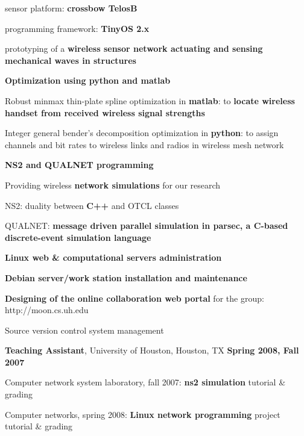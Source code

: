 \documentclass[overlapped, line]{resume}
\begin{document}
\begin{resume}
\begin{list2}
           \begin{list2}
           \item sensor platform: {\bf crossbow TelosB}
           \item programming framework: {\bf TinyOS 2.x}
           \item prototyping of a {\bf wireless sensor network actuating and sensing mechanical waves in structures}
           \end{list2}
         \item \textbf{Optimization using python and matlab}
           \begin{list2}
           \item Robust minmax thin-plate spline optimization in \textbf{matlab}: to {\bf locate wireless handset from received wireless signal strengths}
           \item Integer general bender's decomposition optimization in \textbf{python}: to assign channels and bit rates to wireless links and radios in wireless mesh network
           \end{list2}
         \item \textbf{NS2 and QUALNET programming}
           \begin{list2}
           \item Providing wireless \textbf{network simulations} for our research
           \item NS2: duality between {\bf C++} and OTCL classes
           \item QUALNET: {\bf message driven parallel simulation in parsec, a C-based discrete-event simulation language}
           \end{list2}
         \item \textbf{Linux web \& computational servers administration}
           \begin{list2}
           \item \textbf{Debian server/work station installation and maintenance}
           \item {\bf Designing of the online collaboration web portal} for the group: http://moon.cs.uh.edu
           \item Source version control system management
           \end{list2}
         \end{list2}  \vspace{-5pt}

         {\bf Teaching Assistant}, University of Houston, Houston, TX \hfill {\bf Spring 2008, Fall 2007}\\
         \vspace{-10pt}      %
         \begin{list2}
         \item Computer network system laboratory, fall 2007: \textbf{ns2 simulation} tutorial \& grading
         \item Computer networks, spring 2008: \textbf{Linux network programming} project tutorial \& grading
         \end{list2}  \vspace{-5pt}


\end{resume}
\end{document}
